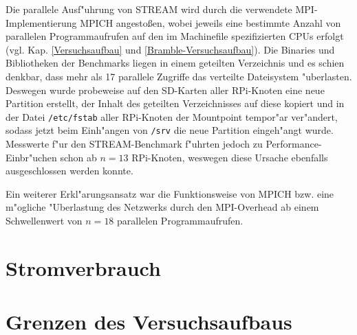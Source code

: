 \begin{enumerate}
Die parallele Ausf"uhrung von STREAM wird durch die verwendete MPI-Implementierung MPICH angesto\ss en, wobei jeweils eine bestimmte Anzahl von parallelen Programmaufrufen auf den im Machinefile spezifizierten CPUs erfolgt (vgl. Kap. \ref{Versuchsaufbau} und \ref{Bramble-Versuchsaufbau}). Die Binaries und Bibliotheken der Benchmarks liegen in einem geteilten Verzeichnis und es schien denkbar, dass mehr als 17 parallele Zugriffe das verteilte Dateisystem "uberlasten. Deswegen wurde probeweise auf den SD-Karten aller RPi-Knoten eine neue Partition erstellt, der Inhalt des geteilten Verzeichnisses auf diese kopiert und in der Datei \texttt{/etc/fstab} aller RPi-Knoten der Mountpoint tempor"ar ver"andert, sodass jetzt beim Einh"angen von \texttt{/srv} die neue Partition eingeh"angt wurde. Messwerte f"ur den STREAM-Benchmark f"uhrten jedoch zu Performance-Einbr"uchen schon ab $n=13$ RPi-Knoten, weswegen diese Ursache ebenfalls ausgeschlossen werden konnte.  

Ein weiterer Erkl"arungsansatz war die Funktionsweise von MPICH bzw. eine m"ogliche "Uberlastung des Netzwerks durch den MPI-Overhead ab einem Schwellenwert von $n=18$ parallelen Programmaufrufen. 

\end{enumerate}

\section{Stromverbrauch}

\section{Grenzen des Versuchsaufbaus}\label{Grenzen}

